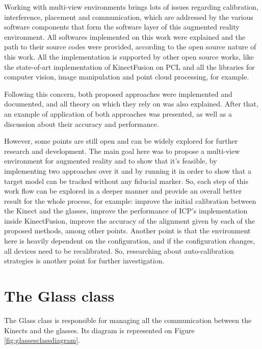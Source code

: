 \documentclass[msc, a4paper, classic, en]{ufbathesis}
\begin{document}
Working with multi-view environments brings lots of issues regarding calibration, interference, placement and communication, which are addressed by the various software components that form the software layer of this augmented reality environment. All softwares implemented on this work were explained and the path to their source codes were provided, according to the open source nature of this work. All the implementation is supported by other open source works, like the state-of-art implementation of KinectFusion on PCL and all the libraries for computer vision, image manipulation and point cloud processing, for example.

Following this concern, both proposed approaches were implemented and documented, and all theory on which they rely on was also explained. After that, an example of application of both approaches was presented, as well as a discussion about their accuracy and performance.

However, some points are still open and can be widely explored for further research and development. The main goal here was to propose a multi-view environment for augmented reality and to show that it's feasible, by implementing two approaches over it and by running it in order to show that a target model can be tracked without any fiducial marker. So, each step of this work flow can be explored in a deeper manner and provide an overall better result for the whole process, for example: improve the initial calibration between the Kinect and the glasses, improve the performance of ICP's implementation inside KinectFusion, improve the accuracy of the alignment given by each of the proposed methods, among other points. Another point is that the environment here is heavily dependent on the configuration, and if the configuration changes, all devices need to be recalibrated. So, researching about auto-calibration strategies is another point for further investigation.

\backmatter

\appendix
\label{appendix}

\chapter{The Glass class}

The Glass class is responsible for managing all the communication between the Kinects and the glasses. Its diagram is represented on Figure \ref{fig:glassesclassdiagram}.
\end{document}
